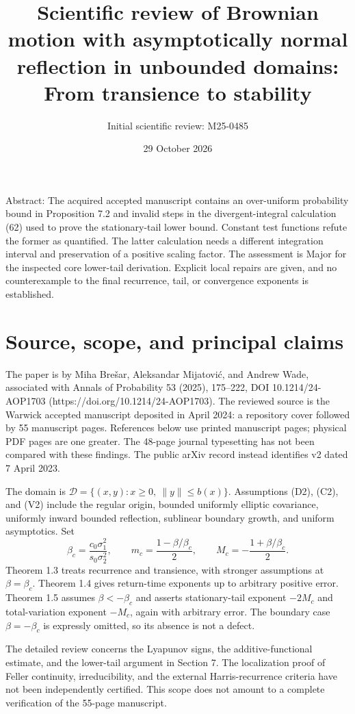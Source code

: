 \documentclass[10pt]{article}
\title{Scientific review of
Brownian motion with asymptotically normal reflection in unbounded domains: From transience to stability}
\author{Initial scientific review: M25-0485}
\date{29 October 2026}
\begin{document}
\maketitle
Abstract: The acquired accepted manuscript contains an over-uniform probability bound in Proposition 7.2 and invalid steps in the divergent-integral calculation (62) used to prove the stationary-tail lower bound. Constant test functions refute the former as quantified. The latter calculation needs a different integration interval and preservation of a positive scaling factor. The assessment is Major for the inspected core lower-tail derivation. Explicit local repairs are given, and no counterexample to the final recurrence, tail, or convergence exponents is established.\par
\section*{Source, scope, and principal claims}
The paper is by Miha Brešar, Aleksandar Mijatović, and Andrew Wade, associated with Annals of Probability 53 (2025), 175–222, DOI 10.1214/24-AOP1703 (https://doi.org/10.1214/24-AOP1703). The reviewed source is the Warwick accepted manuscript deposited in April 2024: a repository cover followed by 55 manuscript pages. References below use printed manuscript pages; physical PDF pages are one greater. The 48-page journal typesetting has not been compared with these findings. The public arXiv record instead identifies v2 dated 7 April 2023.\par
The domain is \(\mathcal D=\{(x,y):x\ge0,\ \|y\|\le b(x)\}\). Assumptions (D2), (C2), and (V2) include the regular origin, bounded uniformly elliptic covariance, uniformly inward bounded reflection, sublinear boundary growth, and uniform asymptotics. Set \[\beta_c=\frac{c_0\sigma_1^2}{s_0\sigma_2^2},\qquad
 m_c=\frac{1-\beta/\beta_c}{2},\qquad
 M_c=-\frac{1+\beta/\beta_c}{2}.\] Theorem 1.3 treats recurrence and transience, with stronger assumptions at \(\beta=\beta_c\). Theorem 1.4 gives return-time exponents up to arbitrary positive error. Theorem 1.5 assumes \(\beta<-\beta_c\) and asserts stationary-tail exponent \(-2M_c\) and total-variation exponent \(-M_c\), again with arbitrary error. The boundary case \(\beta=-\beta_c\) is expressly omitted, so its absence is not a defect.\par
The detailed review concerns the Lyapunov signs, the additive-functional estimate, and the lower-tail argument in Section 7. The localization proof of Feller continuity, irreducibility, and the external Harris-recurrence criteria have not been independently certified. This scope does not amount to a complete verification of the 55-page manuscript.\par
\end{document}
